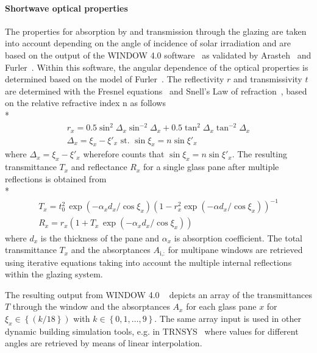 \paragraph{Shortwave optical properties}
The properties for absorption by and transmission through the glazing are taken into account depending on the angle of incidence of solar irradiation and are based on the output of the WINDOW 4.0 software~\cite{Lawrence1993,Finlayson1993} as validated by Arasteh~\cite{Arasteh1986} and Furler~\cite{Furler1988}. Within this software, the angular dependence of the optical properties is determined based on the model of Furler~\cite{Furler1991}. The reflectivity $r$ and  transmissivity $t$ are determined with the Fresnel equations~\cite{Fresnel1926} and Snell's Law of refraction~\cite{Snellius1627},  based on the relative refractive index n as follows \\*
\begin{gather}
r_{x} = 0.5\sin^{2}\Delta_{x} \sin^{-2}\Delta_{x} + 0.5\tan^{2}\Delta_{x}\tan^{-2}\Delta_{x} \\
\Delta_{x}=\xi_{x}-\xi'_{x} \mbox{ st. } \sin \xi_{x} = n\sin \xi'_{x}
\end{gather}
where $\Delta_{x}=\xi_{x}-\xi'_{x}$ wherefore counts that $\sin \xi_{x} = n\sin \xi'_{x}$. The resulting transmittance $T_{x}$ and reflectance $R_{x}$ for a single glass pane after multiple reflections is obtained from \\*
\begin{gather}
T_{x} = t_{0}^{2} \, \exp\left(-\alpha_{x} d_{x}/\cos \xi_{x} \right) \left(1-r_{x}^{2} \exp\left(-\alpha d_{x}/\cos \xi_{x}\right)\right)^{-1} \\
R_{x} = r_{x} \left(1+T_{x} \, \exp\left(-\alpha_{x} d_{x}/\cos \xi_{x}\right)\right)
\end{gather}
where $d_{x}$ is the thickness of the pane and $\alpha_{x}$ is absorption coefficient. The total transmittance $T_{x}$ and the absorptances $A_{\textrm{i,:}}$ for multipane windows are retrieved using iterative equations taking into account the multiple internal reflections within the glazing system.

The resulting output from WINDOW 4.0 ~\cite{Lawrence1993} depicts an array of the transmittances $T$ through the window and the absorptances $A_{x}$ for each glass pane $x$ for $\xi_{x}\in\left\{\left(k/18\right\}\right)$ with $k\in\left\{0,1,\ldots,9\right\}$. The same array input is used in other dynamic building simulation tools, e.g. in TRNSYS~\cite{Solar2009} where values for different angles are retrieved by means of linear interpolation. 

